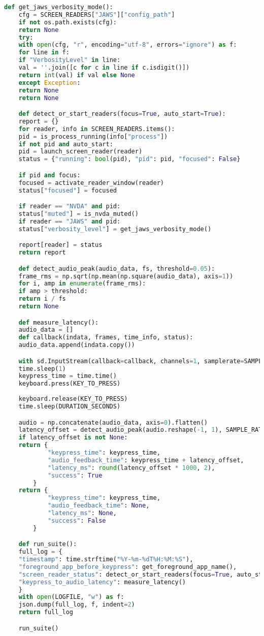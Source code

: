 \begin{lstlisting}[language=Python]
	def get_jaws_verbosity_mode():
	cfg = SCREEN_READERS["JAWS"]["config_path"]
	if not os.path.exists(cfg):
	return None
	try:
	with open(cfg, "r", encoding="utf-8", errors="ignore") as f:
	for line in f:
	if "VerbosityLevel" in line:
	val = ''.join([c for c in line if c.isdigit()])
	return int(val) if val else None
	except Exception:
	return None
	return None

	def detect_or_start_readers(focus=True, auto_start=True):
	report = {}
	for reader, info in SCREEN_READERS.items():
	pid = is_process_running(info["process"])
	if not pid and auto_start:
	pid = launch_screen_reader(reader)
	status = {"running": bool(pid), "pid": pid, "focused": False}

	if pid and focus:
	focused = activate_reader_window(reader)
	status["focused"] = focused

	if reader == "NVDA" and pid:
	status["muted"] = is_nvda_muted()
	if reader == "JAWS" and pid:
	status["verbosity_level"] = get_jaws_verbosity_mode()

	report[reader] = status
	return report

	def detect_audio_peak(audio_data, fs, threshold=0.05):
	frame_rms = np.sqrt(np.mean(np.square(audio_data), axis=1))
	for i, amp in enumerate(frame_rms):
	if amp > threshold:
	return i / fs
	return None

	def measure_latency():
	audio_data = []
	def callback(indata, frames, time_info, status):
	audio_data.append(indata.copy())

	with sd.InputStream(callback=callback, channels=1, samplerate=SAMPLE_RATE):
	time.sleep(1)
	keypress_time = time.time()
	keyboard.press(KEY_TO_PRESS)
	
	keyboard.release(KEY_TO_PRESS)
	time.sleep(DURATION_SECONDS)

	audio = np.concatenate(audio_data, axis=0).flatten()
	latency_offset = detect_audio_peak(audio.reshape(-1, 1), SAMPLE_RATE, THRESHOLD)
	if latency_offset is not None:
	return {
			"keypress_time": keypress_time,
			"audio_feedback_time": keypress_time + latency_offset,
			"latency_ms": round(latency_offset * 1000, 2),
			"success": True
		}
	return {
			"keypress_time": keypress_time,
			"audio_feedback_time": None,
			"latency_ms": None,
			"success": False
		}

	def run_suite():
	full_log = {
	"timestamp": time.strftime("%Y-%m-%dT%H:%M:%S"),
	"foreground_app_before_keypress": get_foreground_app_name(),
	"screen_reader_status": detect_or_start_readers(focus=True, auto_start=True),
	"keypress_to_audio_latency": measure_latency()
	}
	with open(LOGFILE, "w") as f:
	json.dump(full_log, f, indent=2)
	return full_log

	run_suite()
\end{lstlisting}

